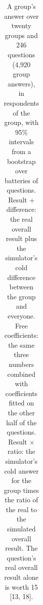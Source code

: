 \begin{table}[h]
\begin{tabular}{lcccccc}
\bottomrule
\end{tabular}
\caption{A group's answer over twenty groups and 246 questions (4,920 group answers), in respondents of the group, with 95\% intervals from a bootstrap over batteries of questions. Result + difference: the real overall result plus the simulator's cold difference between the group and everyone. Free coefficients: the same three numbers combined with coefficients fitted on the other half of the questions. Result $\times$ ratio: the simulator's cold answer for the group times the ratio of the real to the simulated overall result. The question's real overall result alone is worth 15 [13, 18].}
\label{tab:grpci}
\end{table}

